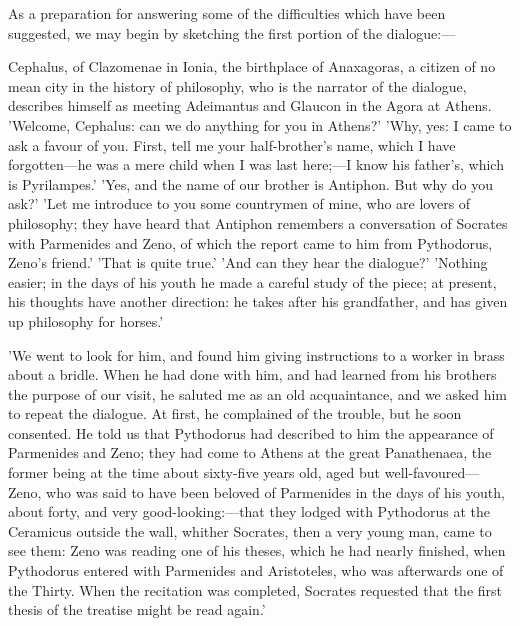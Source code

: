 \documentclass[11pt,letter]{article}
\begin{document}
\par  As a preparation for answering some of the difficulties which have been suggested, we may begin by sketching the first portion of the dialogue:—

\par  Cephalus, of Clazomenae in Ionia, the birthplace of Anaxagoras, a citizen of no mean city in the history of philosophy, who is the narrator of the dialogue, describes himself as meeting Adeimantus and Glaucon in the Agora at Athens. 'Welcome, Cephalus: can we do anything for you in Athens?' 'Why, yes: I came to ask a favour of you. First, tell me your half-brother's name, which I have forgotten—he was a mere child when I was last here;—I know his father's, which is Pyrilampes.' 'Yes, and the name of our brother is Antiphon. But why do you ask?' 'Let me introduce to you some countrymen of mine, who are lovers of philosophy; they have heard that Antiphon remembers a conversation of Socrates with Parmenides and Zeno, of which the report came to him from Pythodorus, Zeno's friend.' 'That is quite true.' 'And can they hear the dialogue?' 'Nothing easier; in the days of his youth he made a careful study of the piece; at present, his thoughts have another direction: he takes after his grandfather, and has given up philosophy for horses.'

\par  'We went to look for him, and found him giving instructions to a worker in brass about a bridle. When he had done with him, and had learned from his brothers the purpose of our visit, he saluted me as an old acquaintance, and we asked him to repeat the dialogue. At first, he complained of the trouble, but he soon consented. He told us that Pythodorus had described to him the appearance of Parmenides and Zeno; they had come to Athens at the great Panathenaea, the former being at the time about sixty-five years old, aged but well-favoured—Zeno, who was said to have been beloved of Parmenides in the days of his youth, about forty, and very good-looking:—that they lodged with Pythodorus at the Ceramicus outside the wall, whither Socrates, then a very young man, came to see them: Zeno was reading one of his theses, which he had nearly finished, when Pythodorus entered with Parmenides and Aristoteles, who was afterwards one of the Thirty. When the recitation was completed, Socrates requested that the first thesis of the treatise might be read again.'
\end{document}
